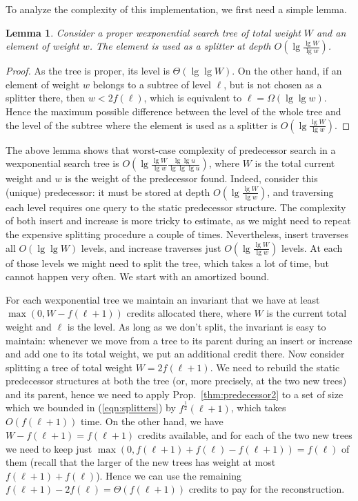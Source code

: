 \documentclass[11pt,onecolumn,final]{article} \usepackage{a4}
\theoremstyle{plain}
\newtheorem{lemma}[definition]{Lemma}
\theoremstyle{remark}
\begin{document}
To analyze the complexity of this implementation, we first need a simple lemma.

\begin{lemma}
Consider a proper wexponential search tree of total weight $W$ and an element of weight $w$. The element is used as a splitter at depth $O(\lg\frac{\lg W}{\lg w})$.
\end{lemma}

\begin{proof}
As the tree is proper, its level is $\Theta(\lg\lg W)$. On the other hand, if an element of weight $w$ belongs to a subtree of level $\ell$, but is not chosen as a splitter there, then $w< 2f(\ell)$,
which is equivalent to $\ell = \Omega(\lg\lg w)$. Hence the maximum possible difference between the level of the whole tree and the level of the subtree where the element is used as a splitter is $O(\lg\frac{\lg W}{\lg w})$.
\end{proof}

The above lemma shows that worst-case complexity of predecessor search in a wexponential search tree is $O(\lg\frac{\lg W}{\lg w}\frac{\lg\lg u}{\lg\lg\lg u})$, where $W$ is the total current weight and $w$ is the weight of the predecessor found. Indeed, consider this (unique) predecessor: it must be stored at depth $O(\lg\frac{\lg W}{\lg w})$, and traversing each level requires one query to the static predecessor structure. The complexity of both insert and increase is more tricky to estimate, as we might need to repeat the expensive splitting procedure a couple of times. Nevertheless, insert traverses all $O(\lg\lg W)$ levels, and increase traverses just $O(\lg\frac{\lg W}{\lg w})$ levels. At each of those levels we might need to split the tree, which takes a lot of time, but cannot happen very often. We start with an amortized bound.

For each wexponential tree we maintain an invariant that we have at least $\max(0,W-f(\ell+1))$ credits allocated there, where $W$ is the current total weight and $\ell$ is the level. As long as we don't split, the invariant is easy to maintain: whenever we move from a tree to its parent during an insert or increase and add one to its total weight, we put an additional credit there. Now consider splitting a tree of total weight $W=2f(\ell+1)$. We need to rebuild the static predecessor structures at both the tree (or, more precisely, at the two new trees) and its parent, hence we need to apply Prop.~\ref{thm:predecessor2} to a set of size which we bounded in (\ref{eqn:splitters}) by $f^{\frac{1}{2}}(\ell+1)$, which takes $O(f(\ell+1))$ time. On the other hand, we have $W-f(\ell+1)=f(\ell+1)$ credits available, and for each of the two new trees we need to keep just $\max(0,f(\ell+1)+f(\ell)-f(\ell+1))=f(\ell)$ of them (recall that the larger of the new trees has weight at most $f(\ell+1)+f(\ell)$). Hence we can use the remaining $f(\ell+1)-2f(\ell)=\Theta(f(\ell+1))$ credits to pay for the reconstruction.
\end{document}
